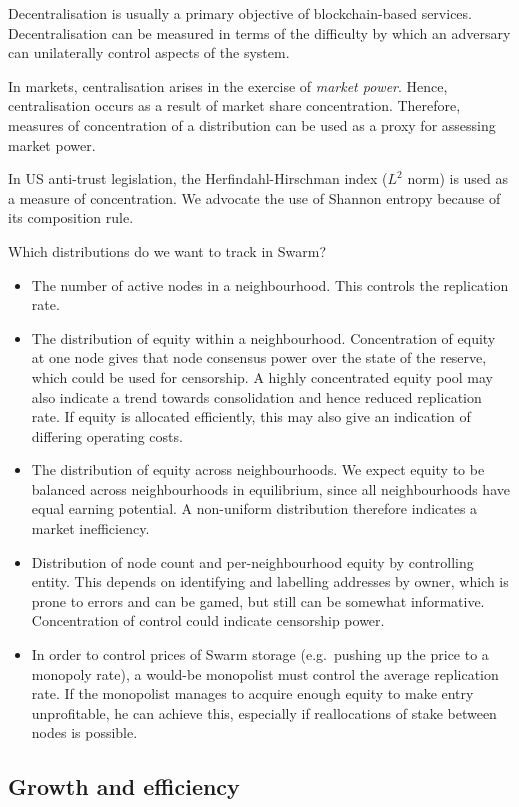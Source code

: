 Decentralisation is usually a primary objective of blockchain-based services.
%
Decentralisation can be measured in terms of the difficulty by which an adversary can unilaterally control aspects of the system.

In markets, centralisation arises in the exercise of \emph{market power}.
%
Hence, centralisation occurs as a result of market share concentration.
%
Therefore, measures of concentration of a distribution can be used as a proxy for assessing market power.

In US anti-trust legislation, the Herfindahl-Hirschman index ($L^2$ norm) is used as a measure of concentration.
%
We advocate the use of Shannon entropy because of its composition rule.

Which distributions do we want to track in Swarm?
%
\begin{itemize}
  \item The number of active nodes in a neighbourhood. This controls the replication rate.
  \item The distribution of equity within a neighbourhood.
  Concentration of equity at one node gives that node consensus power over the state of the reserve, which could be used for censorship.
  A highly concentrated equity pool may also indicate a trend towards consolidation and hence reduced replication rate. 
  If equity is allocated efficiently, this may also give an indication of differing operating costs.
  \item The distribution of equity across neighbourhoods. We expect equity to be balanced across neighbourhoods in equilibrium, since all neighbourhoods have equal earning potential. A non-uniform distribution therefore indicates a market inefficiency.
  \item Distribution of node count and per-neighbourhood equity by controlling entity. 
  This depends on identifying and labelling addresses by owner, which is prone to errors and can be gamed, but still can be somewhat informative.
  Concentration of control could indicate censorship power.
  \item In order to control prices of Swarm storage (e.g.~pushing up the price to a monopoly rate), a would-be monopolist must control the average replication rate.
  If the monopolist manages to acquire enough equity to make entry unprofitable, he can achieve this, especially if reallocations of stake between nodes is possible.
\end{itemize}

\subsection{Growth and efficiency}

